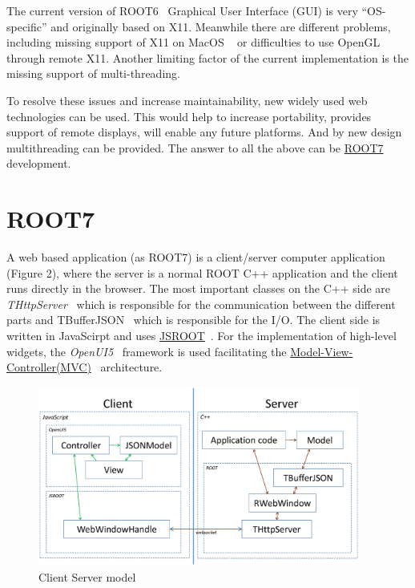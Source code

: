 \documentclass[a4paper]{jpconf}
\begin{document}
The current version of ROOT6~\cite{root6} Graphical User Interface (GUI) is very ``OS-specific'' and originally based on X11.
Meanwhile there are different problems, including missing support of X11 on MacOS ~\cite{x11} or difficulties to use OpenGL through remote X11.
Another limiting factor of the current implementation is the missing support of multi-threading.

To resolve these issues and increase maintainability, new widely used web technologies can be used. This would help to increase portability,
provides support of remote displays, will enable any future platforms. And by new design multithreading can be provided.
The answer to all the above can be \href{https://root.cern/root-7}{ROOT7}~\cite{root7} development.

\section{ROOT7}

A web based application (as ROOT7) is a client/server computer application (Figure 2),
where the server is a normal ROOT C++ application and the client runs directly in the browser.
The most important classes on the C++ side are {\it THttpServer}~\cite{http} which is responsible
for the communication between the different parts and TBufferJSON~\cite{buffer}
which is responsible for the I/O. The client side is written in JavaScirpt and uses \href{https://root.cern/js/}{JSROOT}~\cite{jsroot}.
For the implementation of high-level widgets, the \textit{OpenUI5}~\cite{openui} framework is used facilitating the
\href{https://en.wikipedia.org/wiki/Model%E2%80%93view%E2%80%93controller}{Model-View-Controller(MVC)}~\cite{mvc}
architecture.

\begin{figure}[h]
  \begin{center}
    \includegraphics[width=25pc]{figure2.eps}\hspace{2pc}%
  \end{center}
  \centering
\begin{minipage}[b]{20pc}\caption{\label{label}Client Server model}
\end{minipage}
\end{figure}
\end{document}
